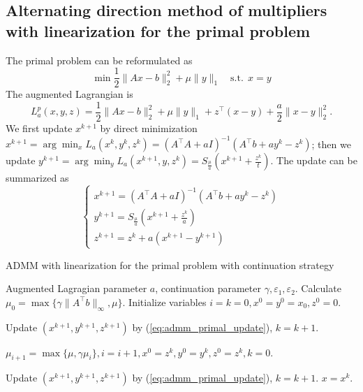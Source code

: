 \documentclass{article}
\numberwithin{equation}{section}
\numberwithin{figure}{section}
\begin{document}
\subsection{Alternating direction method of multipliers with linearization for the primal problem}
The primal problem can be reformulated as
\begin{equation}
    \min \frac{1}{2}\|Ax-b\|_2^2+\mu\|y\|_1\quad \mathrm{s.t.\ \ } x=y
\end{equation}
The augmented Lagrangian is
\begin{equation}
    L_a^p(x,y,z) = \frac{1}{2}\|Ax-b\|_2^2+\mu \|y\|_1+z^\top(x-y)+\frac{a}{2}\|x-y\|_2^2.
\end{equation}
We first update $x^{k+1}$ by direct minimization $x^{k+1}=\arg\min_xL_a(x^k,y^k,z^k)=(A^\top A+aI)^{-1}(A^\top b+ay^k-z^k)$; then we update $y^{k+1}=\arg\min_yL_a(x^{k+1},y,z^k)=S_{\frac{\mu}{a}}(x^{k+1}+\frac{z^k}{t})$. The update can be summarized as
\begin{equation}
\label{eq:admm_primal_update}
    \begin{cases}
    x^{k+1}=(A^\top A+aI)^{-1}(A^\top b+ay^k-z^k)\\
    y^{k+1}=S_{\frac{\mu}{a}}(x^{k+1}+\frac{z^k}{a})\\
    z^{k+1}=z^k+a(x^{k+1}-y^{k+1})
    \end{cases}
\end{equation}

\begin{algorithm}[!htbp]\caption{ADMM with linearization for the primal problem with continuation strategy}\label{alg:alm}
\begin{algorithmic}[1]
 Augmented Lagragian parameter $a$, continuation parameter $\gamma, \varepsilon_1, \varepsilon_2$.
Calculate $\mu_0=\max\{\gamma\|A^\top b\|_\infty,\mu\}$. Initialize variables $i=k=0,x^0=y^0=x_0,z^0=0$.
\item Update $(x^{k+1},y^{k+1},z^{k+1})$ by (\ref{eq:admm_primal_update}), $k = k+1$.
\ENDFOR
\item $\mu_{i+1}=\max\{\mu, \gamma\mu_i\}, i = i+1, x^0=z^k,y^0=y^k,z^0=z^k,k=0$.
\ENDWHILE
{}
\item Update $(x^{k+1},y^{k+1},z^{k+1})$ by (\ref{eq:admm_primal_update}), $k = k+1$.
\ENDFOR
\STATE $x=x^k$.
\end{algorithmic}
\end{algorithm}
\end{document}
